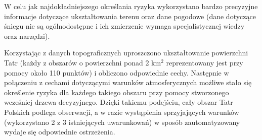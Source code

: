 W celu jak najdokładniejszego określania ryzyka wykorzystano bardzo precyzyjne informacje dotyczące ukształtowania terenu oraz dane pogodowe (dane dotyczące śniegu nie są ogólnodostępne i ich zmierzenie wymaga specjalistycznej wiedzy oraz narzędzi). 

Korzystając z danych topograficznych uproszczono ukształtowanie powierzchni Tatr (każdy z obszarów  o powierzchni ponad 2 km$^2$ reprezentowany jest przy pomocy około 110 punktów) i obliczono odpowiednie cechy. Następnie w połączeniu z cechami dotyczącymi warunków atmosferycznych możliwe stało się określenie ryzyka dla każdego takiego obszaru przy pomocy stworzonego wcześniej drzewa decyzyjnego. Dzięki takiemu podejściu, cały obszar Tatr Polskich podlega obserwacji, a w razie wystąpienia sprzyjających warunków (wykorzystano 2 z 3 istniejących uwarunkowań) w sposób zautomatyzowany wydaje się odpowiednie ostrzeżenia.



















